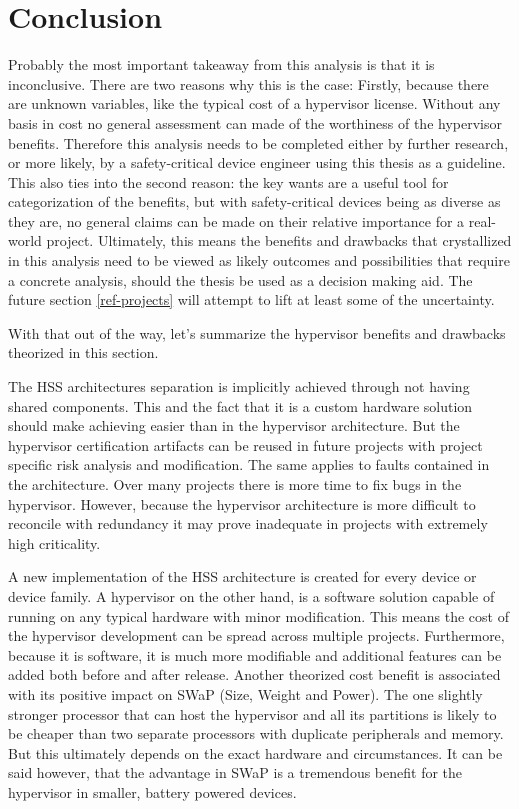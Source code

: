 \section{Conclusion}
Probably the most important takeaway from this analysis is that it is inconclusive. There are two reasons why this is the case: Firstly, because there are unknown variables, like the typical cost of a hypervisor license. Without any basis in cost no general assessment can made of the worthiness of the hypervisor benefits. Therefore this analysis needs to be completed either by further research, or more likely, by a safety-critical device engineer using this thesis as a guideline. This also ties into the second reason: the key wants are a useful tool for categorization of the benefits, but with safety-critical devices being as diverse as they are, no general claims can be made on their relative importance for a real-world project. Ultimately, this means the benefits and drawbacks that crystallized in this analysis need to be viewed as likely outcomes and possibilities that require a concrete analysis, should the thesis be used as a decision making aid. The future section \ref{ref-projects} will attempt to lift at least some of the uncertainty.

With that out of the way, let's summarize the hypervisor benefits 
and drawbacks theorized in this section.

The \gls{HSS} architectures separation is implicitly achieved through not having shared components. This and the fact that it is a custom hardware solution should make achieving  easier than in the hypervisor architecture. But the hypervisor certification artifacts can be reused in future projects with project specific risk analysis and modification. The same applies to faults contained in the architecture. Over many projects there is more time to fix bugs in the hypervisor. However, because the hypervisor architecture is more difficult to reconcile with redundancy it may prove inadequate in projects with extremely high criticality.

A new implementation of the \gls{HSS} architecture is created for every device or device family. A hypervisor on the other hand, is a software solution capable of running on any typical hardware with minor modification. This means the cost of the hypervisor development can be spread across multiple projects. Furthermore, because it is software, it is much more modifiable and additional features can be added both before and after release. Another theorized cost benefit is associated with its positive impact on \gls{SWaP} (Size, Weight and Power). The one slightly stronger processor that can host the hypervisor and all its partitions is likely to be cheaper than two separate processors with duplicate peripherals and memory. But this ultimately depends on the exact hardware and circumstances. It can be said however, that the advantage in \gls{SWaP} is a tremendous benefit for the hypervisor in smaller, battery powered devices.

